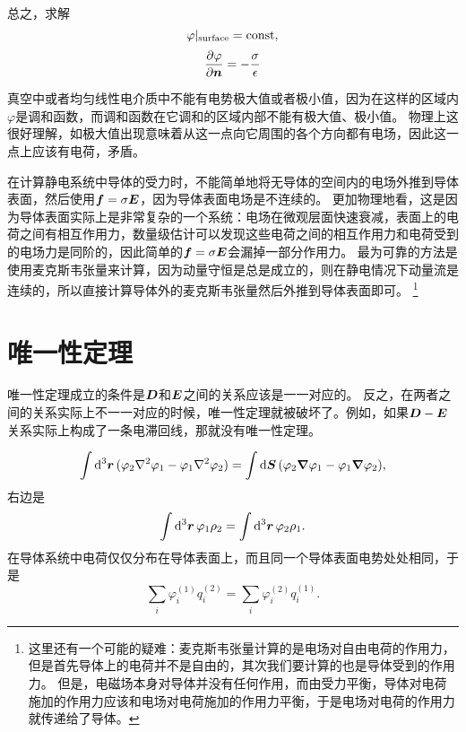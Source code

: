 总之，求解
\begin{equation}
    \varphi|_\text{surface} = \mathrm{const},
\end{equation}
\begin{equation}
    \pdv{\varphi}{\vb*{n}} = - \frac{\sigma}{\epsilon}
\end{equation}

真空中或者均匀线性电介质中不能有电势极大值或者极小值，因为在这样的区域内$\varphi$是调和函数，而调和函数在它调和的区域内部不能有极大值、极小值。
物理上这很好理解，如极大值出现意味着从这一点向它周围的各个方向都有电场，因此这一点上应该有电荷，矛盾。

在计算静电系统中导体的受力时，不能简单地将无导体的空间内的电场外推到导体表面，然后使用$\vb*{f}=\sigma\vb*{E}$，因为导体表面电场是不连续的。
更加物理地看，这是因为导体表面实际上是非常复杂的一个系统：电场在微观层面快速衰减，表面上的电荷之间有相互作用力，数量级估计可以发现这些电荷之间的相互作用力和电荷受到的电场力是同阶的，因此简单的$\vb*{f}=\sigma\vb*{E}$会漏掉一部分作用力。
最为可靠的方法是使用麦克斯韦张量来计算，因为动量守恒是总是成立的，则在静电情况下动量流是连续的，所以直接计算导体外的麦克斯韦张量然后外推到导体表面即可。%
\footnote{
    这里还有一个可能的疑难：麦克斯韦张量计算的是电场对自由电荷的作用力，但是首先导体上的电荷并不是自由的，其次我们要计算的也是导体受到的作用力。
    但是，电磁场本身对导体并没有任何作用，而由受力平衡，导体对电荷施加的作用力应该和电场对电荷施加的作用力平衡，于是电场对电荷的作用力就传递给了导体。
}%

\section{唯一性定理}

唯一性定理成立的条件是$\vb*{D}$和$\vb*{E}$之间的关系应该是一一对应的。
反之，在两者之间的关系实际上不一一对应的时候，唯一性定理就被破坏了。例如，如果$\vb*{D}-\vb*{E}$关系实际上构成了一条电滞回线，那就没有唯一性定理。


\[
    \int \dd[3]{\vb*{r}} (\varphi_2 \laplacian{\varphi_1} - \varphi_1 \laplacian{\varphi_2}) = \int \dd{\vb*{S}} (\varphi_2 \grad{\varphi_1} - \varphi_1 \grad{\varphi_2}),
\]
右边是
\begin{equation}
    \int \dd[3]{\vb*{r}} \varphi_1 \rho_2 = \int \dd[3]{\vb*{r}} \varphi_2 \rho_1.
\end{equation}
在导体系统中电荷仅仅分布在导体表面上，而且同一个导体表面电势处处相同，于是
\begin{equation}
    \sum_i \varphi_i^{(1)} q_i^{(2)} = \sum_i \varphi_i^{(2)} q_i^{(1)}.
\end{equation}

